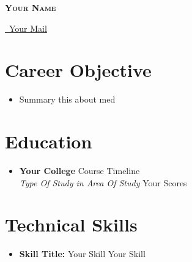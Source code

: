 \documentclass[letterpaper,5pt]{article}
\begin{document}
    
    \begin{center}
      \textbf{\Huge \scshape Your Name} \\ \vspace{5pt}
      
      \href{mailto:mail@mail.com}{\raisebox{-0.05\height}\faEnvelope \ Your Mail} 
       \
       \
       \
    \end{center}
    
      \section{Career Objective}
        \begin{itemize}[leftmargin=0.15in, label={}]
          \item{Summary this about med}
        \end{itemize}
    
    \section{Education}
      
        \begin{itemize}
        \item
            \textbf{Your College} \hfill Course Timeline \\
            \textit{Type Of Study in Area Of Study} \hfill Your Scores
        \end{itemize}
      
      

    
    \section{Technical Skills}
    
        \begin{itemize}[leftmargin=0.15in,label={}]
        \item{
          \textbf{Skill Title: }{\textbullet{} Your Skill \textbullet{} Your Skill \newline}
        }
        \end{itemize}
        \vspace*{-6mm}  
        
\end{document}
